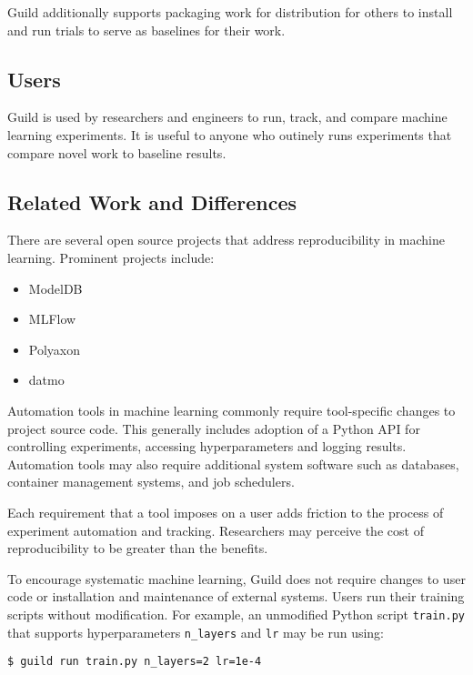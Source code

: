 \documentclass{article}
\begin{document}
Guild additionally supports packaging work for distribution for others
to install and run trials to serve as baselines for their work.

\subsection{Users}

Guild is used by researchers and engineers to run, track, and compare
machine learning experiments. It is useful to anyone who outinely runs
experiments that compare novel work to baseline results.

\subsection{Related Work and Differences}

There are several open source projects that address reproducibility in
machine learning. Prominent projects include:

\begin{itemize}[noitemsep, topsep=0pt, partopsep=0pt]
\item ModelDB \cite{modeldb}
\item MLFlow \cite{mlflow}
\item Polyaxon \cite{polyaxon}
\item datmo \cite{datmo}
\end{itemize}

Automation tools in machine learning commonly require tool-specific
changes to project source code. This generally includes adoption of a
Python API for controlling experiments, accessing hyperparameters and
logging results. Automation tools may also require additional system
software such as databases, container management systems, and job
schedulers.

Each requirement that a tool imposes on a user adds friction to the
process of experiment automation and tracking. Researchers may
perceive the cost of reproducibility to be greater than the benefits.

To encourage systematic machine learning, Guild does not require
changes to user code or installation and maintenance of external
systems. Users run their training scripts without modification. For
example, an unmodified Python script \texttt{train.py} that supports
hyperparameters \texttt{n\_layers} and \texttt{lr} may be run using:

{\footnotesize
\begin{verbatim}
$ guild run train.py n_layers=2 lr=1e-4
\end{verbatim}}
\end{document}
